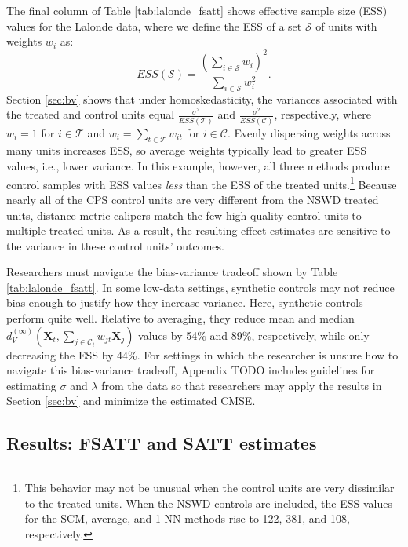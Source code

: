 \documentclass{article}
\newcommand{\Xt}{\mathbf{X}_t}
\newcommand{\Xj}{\mathbf{X}_j}
\newcommand{\Ct}{\mathcal{C}_{t}}
\begin{document}
The final column of Table \ref{tab:lalonde_fsatt} shows effective sample size (ESS) values for the Lalonde data, where we define the ESS of a set $\mathcal{S}$ of units with weights $w_i$ as: 
$$ESS(\mathcal{S}) = \frac{(\sum_{i \in \mathcal{S}} w_i)^2}{\sum_{i \in \mathcal{S}} w_i^2}.$$
Section \ref{sec:bv} shows that under homoskedasticity, the variances associated with the treated and control units equal $\frac{\sigma^2}{ESS(\mathcal{T})}$ and $\frac{\sigma^2}{ESS(\mathcal{C})}$, respectively, where $w_i = 1$ for $i \in \mathcal{T}$ and $w_i = \sum_{t \in \mathcal{T}} w_{it}$ for $i \in \mathcal{C}$.
Evenly dispersing weights across many units increases ESS, so average weights typically lead to greater ESS values, i.e., lower variance.
In this example, however, all three methods produce control samples with ESS values \textit{less} than the ESS of the treated units.\footnote{This behavior may not be unusual when the control units are very dissimilar to the treated units. When the NSWD controls are included, the ESS values for the SCM, average, and 1-NN methods rise to 122, 381, and 108, respectively.}
Because nearly all of the CPS control units are very different from the NSWD treated units, distance-metric calipers match the few high-quality control units to multiple treated units.
As a result, the resulting effect estimates are sensitive to the variance in these control units' outcomes.

Researchers must navigate the bias-variance tradeoff shown by Table \ref{tab:lalonde_fsatt}.
In some low-data settings, synthetic controls may not reduce bias enough to justify how they increase variance.
Here, synthetic controls perform quite well.
Relative to averaging, they reduce mean and median $d_V^{(\infty)}(\Xt, \sum_{j \in \Ct} w_{jt} \Xj)$ values by 54\% and 89\%, respectively, while only decreasing the ESS by 44\%.
For settings in which the researcher is unsure how to navigate this bias-variance tradeoff, Appendix TODO includes guidelines for estimating $\sigma$ and $\lambda$ from the data so that researchers may apply the results in Section \ref{sec:bv} and minimize the estimated CMSE.

\subsection{Results: FSATT and SATT estimates}
\label{sec:lalonde_bv}
\end{document}
